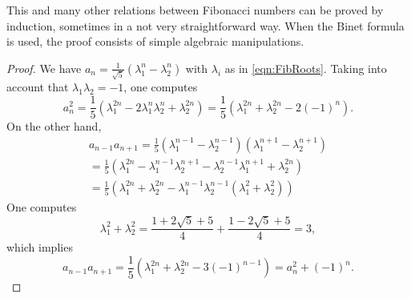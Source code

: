 

\setcounter{section}{2}
\setcounter{subsection}{0}
\setcounter{dfn}{8}

This and many other relations between Fibonacci numbers can be proved by induction,
sometimes in a not very straightforward way.
When the Binet formula is used, the proof consists of simple algebraic manipulations.

\begin{proof}
We have $a_n = \frac{1}{\sqrt{5}}(\lambda_1^n - \lambda_2^n)$ with $\lambda_i$ as in \eqref{eqn:FibRoots}.
Taking into account that $\lambda_1\lambda_2 = -1$, one computes
\[
a_n^2 = \frac15(\lambda_1^{2n} - 2 \lambda_1^n \lambda_2^n + \lambda_2^{2n}) = \frac15(\lambda_1^{2n} + \lambda_2^{2n} - 2(-1)^n).
\]
On the other hand,
\begin{multline*}
a_{n-1} a_{n+1} = \frac15(\lambda_1^{n-1} - \lambda_2^{n-1})(\lambda_1^{n+1} - \lambda_2^{n+1})\\
= \frac15(\lambda_1^{2n} - \lambda_1^{n-1}\lambda_2^{n+1} - \lambda_2^{n-1}\lambda_1^{n+1} + \lambda_2^{2n})\\
= \frac15(\lambda_1^{2n} + \lambda_2^{2n} - \lambda_1^{n-1}\lambda_2^{n-1}(\lambda_1^2 + \lambda_2^2))
\end{multline*}
One computes
\[
\lambda_1^2 + \lambda_2^2 = \frac{1 + 2\sqrt{5} + 5}4 + \frac{1 - 2\sqrt{5} + 5}4 = 3,
\]
which implies
\[
a_{n-1} a_{n+1} = \frac15(\lambda_1^{2n} + \lambda_2^{2n} - 3(-1)^{n-1}) = a_n^2 + (-1)^n.
\]
\end{proof}





